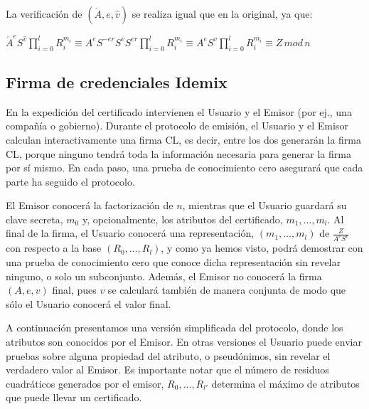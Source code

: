 La verificación de $(\acute{A},e,\hat{v})$ se realiza igual que en la original, ya que:

\begin{center}
	$
	\acute{A}^e S^{\hat{v}} \prod_{i=0}^{l} R_i^{m_i} \equiv A^e S^{-er} S^v S^{er} \prod_{i=0}^{l} R_i^{m_i} \equiv A^e S^v \prod_{i=0}^{l} R_i^{m_i} \equiv Z \, mod \, n
	$
\end{center}


\subsection{Firma de credenciales Idemix}

En la expedición del certificado intervienen el Usuario y el Emisor (por ej., una compañía o gobierno). Durante el protocolo de emisión, el Usuario y el Emisor calculan interactivamente una firma CL, es decir, entre los dos generarán la firma CL, porque ninguno tendrá toda la información necesaria para generar la firma por sí mismo. En cada paso, una prueba de conocimiento cero asegurará que cada parte ha seguido el protocolo.

El Emisor conocerá la factorización de $n$, mientras que el Usuario guardará su clave secreta, $m_0$ y, opcionalmente, los atributos del certificado, $m_1,\dots,m_l$. Al final de la firma, el Usuario conocerá una representación, $(m_1,\dots,m_l)$ de $\frac{Z}{A^eS^v}$ con respecto a la base $(R_0,\dots,R_l)$, y como ya hemos visto, podrá demostrar con una prueba de conocimiento cero que conoce dicha representación sin revelar ninguno, o solo un subconjunto. Además, el Emisor no conocerá la firma $(A,e,v)$ final, pues $v$ se calculará también de manera conjunta de modo que sólo el Usuario conocerá el valor final.

\hfil

A continuación presentamos una versión simplificada del protocolo, donde los atributos son conocidos por el Emisor. En otras versiones el Usuario puede enviar pruebas sobre alguna propiedad del atributo, o pseudónimos, sin revelar el verdadero valor al Emisor. Es importante notar que el número de residuos cuadráticos generados por el emisor, $R_0,\dots,R_{l'}$ determina el máximo de atributos que puede llevar un certificado.


